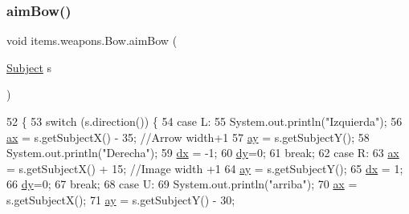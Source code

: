 \subsubsection{\texorpdfstring{aim\+Bow()}{aimBow()}\hspace{0.1cm}{\footnotesize\ttfamily [1/2]}}
{\footnotesize\ttfamily void items.\+weapons.\+Bow.\+aim\+Bow (\begin{DoxyParamCaption}\item[{\mbox{\hyperlink{classentities_1_1_subject}{Subject}}}]{s }\end{DoxyParamCaption})\hspace{0.3cm}{\ttfamily [inline]}}


\begin{DoxyCode}
52                                   \{
53         \textcolor{keywordflow}{switch} (s.direction()) \{
54             \textcolor{keywordflow}{case} L:
55                 System.out.println(\textcolor{stringliteral}{"Izquierda"});
56                 \mbox{\hyperlink{classitems_1_1weapons_1_1_bow_aff7d073599101d3aaad0f525ef067eac}{ax}} = s.getSubjectX() - 35;   \textcolor{comment}{//Arrow width+1}
57                 \mbox{\hyperlink{classitems_1_1weapons_1_1_bow_a3180294cbe39f9b47eea37815dc1c4f6}{ay}} = s.getSubjectY();
58                 System.out.println(\textcolor{stringliteral}{"Derecha"});
59                 \mbox{\hyperlink{classitems_1_1weapons_1_1_bow_a5f5ced169bab348188e9b06ac6862a2b}{dx}} = -1;
60                 \mbox{\hyperlink{classitems_1_1weapons_1_1_bow_a64b7302a20f953d5940e5063d523d772}{dy}}=0;
61                 \textcolor{keywordflow}{break};
62             \textcolor{keywordflow}{case} R:
63                 \mbox{\hyperlink{classitems_1_1weapons_1_1_bow_aff7d073599101d3aaad0f525ef067eac}{ax}} = s.getSubjectX() + 15; \textcolor{comment}{//Image width +1}
64                 \mbox{\hyperlink{classitems_1_1weapons_1_1_bow_a3180294cbe39f9b47eea37815dc1c4f6}{ay}} = s.getSubjectY();
65                 \mbox{\hyperlink{classitems_1_1weapons_1_1_bow_a5f5ced169bab348188e9b06ac6862a2b}{dx}} = 1;
66                 \mbox{\hyperlink{classitems_1_1weapons_1_1_bow_a64b7302a20f953d5940e5063d523d772}{dy}}=0;
67                 \textcolor{keywordflow}{break};
68             \textcolor{keywordflow}{case} U:
69                 System.out.println(\textcolor{stringliteral}{"arriba"});
70                 \mbox{\hyperlink{classitems_1_1weapons_1_1_bow_aff7d073599101d3aaad0f525ef067eac}{ax}} = s.getSubjectX();
71                 \mbox{\hyperlink{classitems_1_1weapons_1_1_bow_a3180294cbe39f9b47eea37815dc1c4f6}{ay}} = s.getSubjectY() - 30;

\end{DoxyCode}
